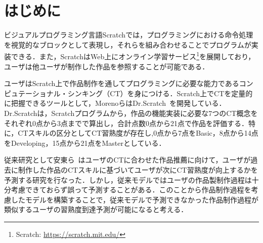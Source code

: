 \documentclass[twocolumn]{jarticle} %
\begin{document}
\maketitle
\thispagestyle{empty} %



\section{はじめに}

ビジュアルプログラミング言語Scratch\cite{Resnick_2009}では，プログラミングにおける命令処理を視覚的なブロックとして表現し，それらを組み合わせることでプログラムが実装できる．また，ScratchはWeb上にオンライン学習サービス\footnote{Scratch: \url{https://scratch.mit.edu/}}を展開しており，ユーザは他ユーザが制作した作品を参照することが可能である．

ユーザはScratch上で作品制作を通してプログラミングに必要な能力であるコンピュテーショナル・シンキング（CT）を身につける．Scratch上でCTを定量的に把握できるツールとして，MorenoらはDr.Scratch~\cite{Moreno_2015}を開発している．Dr.Scratchは，Scratchプログラムから，作品の機能実装に必要な7つのCT概念をそれぞれ0点から3点までで算出し，合計点数0点から21点で作品を評価する．特に，CTスキルの区分としてCT習熟度が存在し,0点から7点をBasic，8点から14点をDeveloping，15点から21点をMasterとしている．

従来研究として安東ら~\cite{Ando_2021}はユーザのCTに合わせた作品推薦に向けて，ユーザが過去に制作した作品のCTスキルに基づいてユーザが次にCT習熟度が向上するかを予測する研究を行なった．しかし，従来モデルではユーザの作品製制作過程は十分考慮できておらず誤って予測することがある．このことから作品制作過程を考慮したモデルを構築することで，従来モデルで予測できなかった作品制作過程が類似するユーザの習熟度到達予測が可能になると考える．


\end{document}
